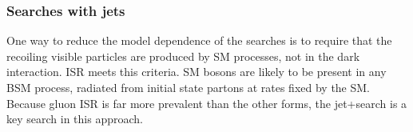 \subsubsection{Searches with jets}



One way to reduce the model dependence of the searches is to require that the recoiling visible particles are produced by SM processes, not in the dark interaction.
ISR meets this criteria.
SM bosons are likely to be present in any BSM process, radiated from initial state partons at rates fixed by the SM.
Because gluon ISR is far more prevalent than the other forms, the jet+\MET search is a key search in this approach.%

